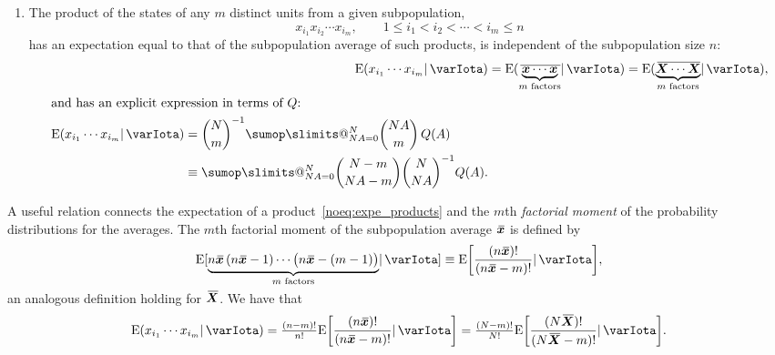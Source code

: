 \documentclass{article}
\makeatletter
\theoremstyle{remark}
\theoremstyle{innote}
\def\sum{\DOTSI\sumop\slimits@}
\newcommand*{\citep}{\parencites}
\renewcommand*{\|}{\mathpunct{|}}%
\renewcommand{\le}{\leqslant}%
\DeclarePairedDelimiter\clcl{[}{]}
\newcommand*{\E}{\mathrm{E}}
\DeclarePairedDelimiter\expp{(}{)}
\newcommand*{\expe}{\E\expp}%
\newcommand*{\expeb}{\E\clcl}%
\theoremstyle{simple}
\newcommand*{\widebar}[1]{{\mkern1.5mu\skew{2}\overline{\mkern-1.5mu#1\mkern-1.5mu}\mkern 1.5mu}}
\newcommand*{\av}{\widebar} %
\newcommand*{\sav}{\widebar} %
\newcommand*{\yxx}{x}%
\newcommand*{\yx}{\bm{\yxx}}%
\newcommand*{\yxs}{\sav{\yx}}%
\newcommand*{\yX}{\bm{X}}%
\newcommand*{\yXf}{\av{\yX}}%
\newcommand*{\yH}{\varIota}
\makeatother
\begin{document}
\begin{enumerate}
\medskip
\item\label{noitem:moments}The product of the states of any $m$ distinct
  units from a given subpopulation,
  \begin{equation*}
    x_{i_1} x_{i_2} \dotsm x_{i_m},
    \qquad 1\le i_1 < i_2 < \dotsb < i_m \le n
  \end{equation*}
  has an expectation equal to that of the subpopulation average of such
  products, is independent of the subpopulation size $n$:
\begin{subequations}
\label{noeq:expe_products}
\begin{align}
  \expe{x_{i_1} \dotsm x_{i_m} \| \yH}
&=
\expe{\sav{\underbrace{\yx \dotsm \yx}_{\text{$m$ factors}}} \| \yH}
=
\expe{\av{\underbrace{\yX \dotsm \yX}_{\text{$m$ factors}}} \| \yH},
\\
\intertext{and has an explicit expression in terms of $Q$:}
  \begin{split}
\expe{x_{i_1} \dotsm x_{i_m} \| \yH}
&=
\binom{N}{m}^{-1}
\sum_{N A=0}^N %
\binom{N A}{m}\, Q(A)
\\
&\equiv
\sum_{N A=0}^N %
\binom{N-m}{N A-m}
\binom{N}{N A}^{-1} Q(A).
\end{split}
\end{align}
\end{subequations}
\end{enumerate}

\medskip


A useful relation connects the expectation of a
product~\eqref{noeq:expe_products} and the $m$th \emph{factorial moment}
\citep{potts1953} of the probability distributions for the averages. The
$m$th factorial moment of the subpopulation average $\yxs$ is defined by
\begin{equation}
  \label{noeq:fact_mom_defin}
\vphantom{\underbrace{\yxs}_{m}}\expeb*{
\smash{\underbrace{n\yxs\,(n\yxs-1)\dotsm \bigl(n\yxs-(m-1)\bigr)}_{\text{$m$ factors}}}
\| \yH}
\equiv \expeb*{\frac{(n\yxs)!}{(n\yxs-m)!} \| \yH},
\end{equation}
an analogous definition holding for $\yXf$. We have that
\begin{equation}
  \label{noeq:eq_factmom_prod}
\expe{x_{i_1} \dotsm x_{i_m} \| \yH}
=
  \tfrac{(n-m)!}{n!}\expeb*{\frac{(n\yxs)!}{(n\yxs-m)!} \| \yH}
=
  \tfrac{(N-m)!}{N!}\expeb*{\frac{(N\yXf)!}{(N\yXf-m)!} \| \yH}.
\end{equation}
\end{document}
